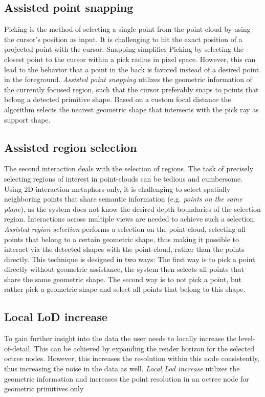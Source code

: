 \subsection{Assisted point snapping}
Picking is the method of selecting a single point from the point-cloud by using the cursor's position as input. It is challenging to hit the exact position of a projected point with the cursor. Snapping simplifies Picking by selecting the closest point to the cursor within a pick radius in pixel space. However, this can lead to the behavior that a point in the back is favored instead of a desired point in the foreground. 
\textit{Assisted point snapping} utilizes the geometric information of the currently focused region, such that the cursor preferably snaps to points that belong a detected primitive shape. Based on a custom focal distance the algorithm selects the nearest geometric shape that intersects with the pick ray as support shape. 
\\
\subsection{Assisted region selection}
The second interaction deals with the selection of regions. The task of precisely selecting regions of interest in point-clouds can be tedious and cumbersome. Using 2D-interaction metaphors only, it is challenging to select spatially neighboring points that share semantic information (e.g. \textit{points on the same plane}), as the system does not know the desired depth boundaries of the selection region. Interactions across multiple views are needed to achieve such a selection. \textit{Assisted region selection} performs a selection on the point-cloud, selecting all points that belong to a certain geometric shape, thus making it possible to interact via the detected shapes with the point-cloud, rather than the points directly. 
This technique is designed in two ways: 
The first way is to pick a point directly without geometric assistance, the system then selects all points that share the same geometric shape.
The second way is to not pick a point, but rather pick a geometric shape and select all points that belong to this shape. 
\\
\subsection{Local LoD increase}
To gain further insight into the data the user needs to locally increase the level-of-detail. This can be achieved by expanding the render horizon for the selected octree nodes. However, this increases the resolution within this node consistently, thus increasing the noise in the data as well. \textit{Local Lod increase} utilizes the geometric information and increases the  point resolution in an octree node for geometric primitives only
